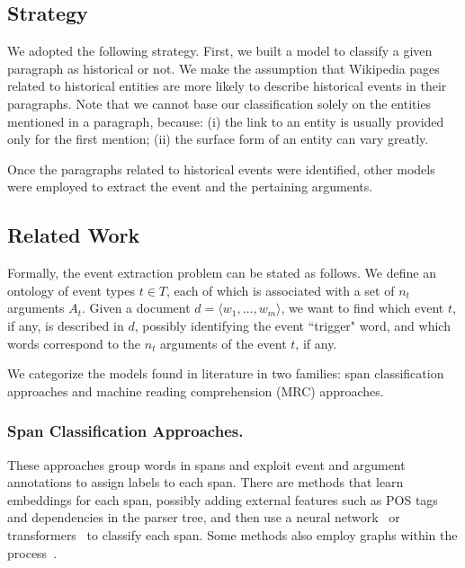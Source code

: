 \documentclass[runningheads]{llncs}
\begin{document}
\subsection{Strategy}

We adopted the following strategy. First, we built a model to classify a given paragraph as historical or not. We make the assumption that Wikipedia pages related to historical entities are more likely to describe historical events in their paragraphs. Note that we cannot base our classification solely on the entities mentioned in a paragraph, because: (i) the link to an entity is usually provided only for the first mention; (ii) the surface form of an entity can vary greatly.

Once the paragraphs related to historical events were identified, other models were employed to extract the event and the pertaining arguments.

\subsection{Related Work}

Formally, the event extraction problem can be stated as follows. We define an ontology of event types $t \in T$, each of which is associated with a set of $n_t$ arguments $A_t$. Given a document $d = \langle w_1, \dots, w_m \rangle$, we want to find which event $t$, if any, is described in $d$, possibly identifying the event “trigger" word, and which words correspond to the $n_t$ arguments of the event $t$, if any.    

We categorize the models found in literature in two families: span classification approaches and machine reading comprehension (MRC) approaches.

\subsubsection{Span Classification Approaches.} These approaches group words in spans and exploit event and argument annotations to assign labels to each span. There are methods that learn embeddings for each span, possibly adding external features such as POS tags and dependencies in the parser tree, and then use a neural network~\cite{ebner-etal-2020-rams,zhong-chen-2021-frustratingly,nguyen-nguyen-2019-one-for-all} or transformers~\cite{chen-etal-2020-joint-modeling} to classify each span. Some methods also employ graphs within the process~\cite{lin-etal-2020-oneie,wadden-etal-2019-entity,luan-etal-2019-general,nguyen-2021-gcn}. 
\end{document}

